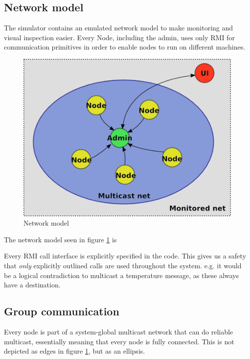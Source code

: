 \documentclass[10pt,a4paper]{article}
\begin{document}
\subsection{Network model}
The simulator contains an emulated network model to make monitoring and visual inspection easier. Every Node, including the admin, uses only RMI for communication primitives in order to enable nodes to run on different machines.

\begin{figure}[h]
\centering
\includegraphics[scale=0.65]{fig/Networkmodel.png}
 \caption{Network model}
 \label{fig:network_model}
\end{figure}

The network model seen in figure \ref{fig:network_model} is %

Every RMI call interface is explicitly specified in the code. This gives us a safety that \emph{only} explicitly outlined calls are used throughout the system. e.g. it would be a logical contradiction to multicast a temperature message, as these always have a destination.

\subsection{Group communication}
Every node is part of a system-global multicast network that can do reliable multicast, essentially meaning that every node is fully connected. This is not depicted as edges in figure \ref{fig:network_model}, but as an ellipsis.
\end{document}

